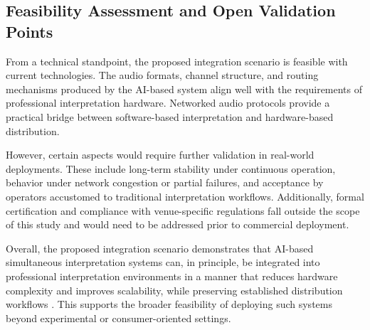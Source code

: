 \subsection*{Feasibility Assessment and Open Validation Points}

From a technical standpoint, the proposed integration scenario is feasible with current technologies. The audio formats, channel structure, and routing mechanisms produced by the AI-based system align well with the requirements of professional interpretation hardware. Networked audio protocols provide a practical bridge between software-based interpretation and hardware-based distribution.

However, certain aspects would require further validation in real-world deployments. These include long-term stability under continuous operation, behavior under network congestion or partial failures, and acceptance by operators accustomed to traditional interpretation workflows. Additionally, formal certification and compliance with venue-specific regulations fall outside the scope of this study and would need to be addressed prior to commercial deployment.

Overall, the proposed integration scenario demonstrates that AI-based simultaneous interpretation systems can, in principle, be integrated into professional interpretation environments in a manner that reduces hardware complexity and improves scalability, while preserving established distribution workflows \cite{corpas-pastor-2021-interpreting}. This supports the broader feasibility of deploying such systems beyond experimental or consumer-oriented settings.

